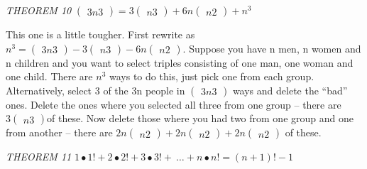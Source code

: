 \documentclass[10pt,letter]{article}
\begin{document}
\emph{THEOREM 10} \(

\begin{pmatrix}
3n 
3 
\end{pmatrix}
 = 3

\begin{pmatrix}
n 
3 
\end{pmatrix}
 + 6n

\begin{pmatrix}
n 
2 
\end{pmatrix}
 + n^{3}\)

This one is a little tougher. First rewrite as \(n^{3} =

\begin{pmatrix}
3n 
3 
\end{pmatrix}
 - 3

\begin{pmatrix}
n 
3 
\end{pmatrix}
 - 6n

\begin{pmatrix}
n 
2 
\end{pmatrix}
\). Suppose you have n men, n women and n children and you
want to select triples consisting of one man, one woman and one child.
There are \(n^{3}\) ways to do this, just pick one from each group.
Alternatively, select 3 of the 3n people in \(

\begin{pmatrix}
3n 
3 
\end{pmatrix}
\) ways and delete the ``bad'' ones. Delete the ones where
you selected all three from one group -- there are \(3

\begin{pmatrix}
n 
3 
\end{pmatrix}
\)of these. Now delete those where you had two from one
group and one from another -- there are \(2n

\begin{pmatrix}
n 
2 
\end{pmatrix}
 + 2n

\begin{pmatrix}
n 
2 
\end{pmatrix}
 + 2n

\begin{pmatrix}
n 
2 
\end{pmatrix}
\) of these.

\emph{THEOREM 11} 
\(1 \bullet 1! + 2 \bullet 2! + 3 \bullet 3! + \ \ldots + n \bullet n! = \left( n + 1 \right)! - 1\)
\end{document}
